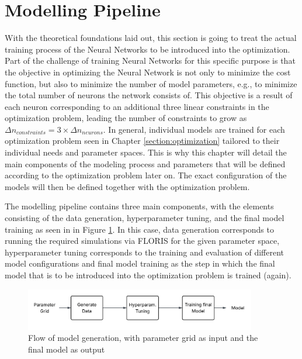 \section{Modelling Pipeline} \label{sec:model_pipe}

With the theoretical foundations laid out, this section is going to treat the actual training process of the Neural Networks to be introduced into the optimization. Part of the challenge of training Neural Networks for this specific purpose is that the objective in optimizing the Neural Network is not only to minimize the cost function, but also to minimize the  number of model parameters, e.g., to minimize the total number of neurons the network consists of. This objective is a result of each neuron corresponding to an additional three linear constraints in the optimization problem, leading the number of constraints to grow as $\Delta n_{constraints} =3 \times \Delta n_{neurons}$. In general, individual models are trained for each optimization problem seen in Chapter \ref{section:optimization} tailored to their individual needs and parameter spaces. This is why this chapter will detail the main components of the modeling process and parameters that will be defined according to the optimization problem later on. The exact configuration of the models will then be defined together with the optimization problem.  

The modelling pipeline contains three main components, with the elements consisting of the data generation, hyperparameter tuning, and the final model training as seen in in Figure \ref{fig:model_flow}. In this case, data generation corresponds to running the required simulations via FLORIS  for the given parameter space, hyperparameter tuning corresponds to the training and evaluation of different model configurations and final model training as the step in which the final model that is to be introduced into the optimization problem is trained (again).


\begin{figure}[h] 
	\centering
	\includegraphics[width=0.9\textwidth]{figures/modelling/model_flow.png} 
	\caption{Flow of model generation, with parameter grid as input and the final model as output}
	\label{fig:model_flow}
\end{figure}

